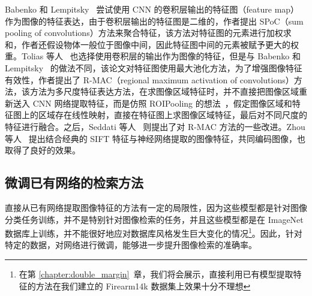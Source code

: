 Babenko 和 Lempitsky~\cite{Babenko2015AggregatingLD} 尝试使用 CNN 的卷积层输出的特征图（feature map）作为图像的特征表达，由于卷积层输出的特征图是二维的，作者提出 SPoC（sum pooling of convolutions）方法来聚合特征，该方法对特征图的元素进行加权求和，作者还假设物体一般位于图像中间，因此特征图中间的元素被赋予更大的权重。Tolias 等人~\cite{Tolias2015ParticularOR} 也选择使用卷积层的输出作为图像的特征，但是与 Babenko 和 Lempitsky~\cite{Babenko2015AggregatingLD} 的做法不同，该论文对特征图使用最大池化方法，为了增强图像特征有效性，作者提出了 R-MAC（regional maximum activation of convolutions）方法，该方法为多尺度特征表达方法，在求图像区域特征时，并不直接把图像区域重新送入 CNN 网络提取特征，而是仿照 ROIPooling 的想法~\cite{Ren2017FasterRT}，假定图像区域和特征图上的区域存在线性映射，直接在特征图上求图像区域特征，最后对不同尺度的特征进行融合。之后，Seddati 等人~\cite{Seddati2017TowardsGP} 则提出了对 R-MAC 方法的一些改进。Zhou 等人~\cite{Zhou2017CollaborativeIE} 提出结合经典的 SIFT 特征与神经网络提取的图像特征，共同编码图像，也取得了良好的效果。

\subsection{微调已有网络的检索方法}

直接从已有网络提取图像特征的方法有一定的局限性，因为这些模型都是针对图像分类任务训练，并不是特别针对图像检索的任务，并且这些模型都是在 ImageNet 数据库上训练，并不能很好地应对数据库风格发生巨大变化的情况\footnote{在第 \ref{chapter:double_margin}~章，我们将会展示，直接利用已有模型提取特征的方法在我们建立的 Firearm14k 数据集上效果十分不理想}。因此，针对特定的数据，对网络进行微调，能够进一步提升图像检索的准确率。

